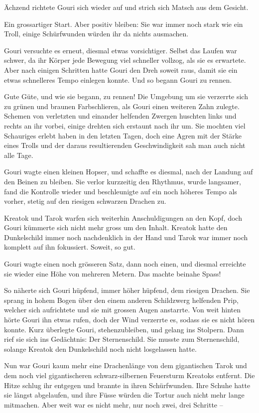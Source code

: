 Ächzend richtete Gouri sich wieder auf und strich sich Matsch aus dem Gesicht.

Ein grossartiger Start. Aber positiv bleiben: Sie war immer noch stark wie ein Troll, einige Schürfwunden würden ihr da nichts ausmachen.

Gouri versuchte es erneut, diesmal etwas vorsichtiger. Selbst das Laufen war schwer, da ihr Körper jede Bewegung viel schneller vollzog, als sie es erwartete. Aber nach einigen Schritten hatte Gouri den Dreh soweit raus, damit sie ein etwas schnelleres Tempo einlegen konnte. Und so begann Gouri zu rennen.

Gute Güte, und wie sie begann, zu rennen! Die Umgebung um sie verzerrte sich zu grünen und braunen Farbschlieren, als Gouri einen weiteren Zahn zulegte. Schemen von verletzten und einander helfenden Zwergen huschten links und rechts an ihr vorbei, einige drehten sich erstaunt nach ihr um. Sie mochten viel Schauriges erlebt haben in den letzten Tagen, doch eine Agren mit der Stärke eines Trolls und der daraus resultierenden Geschwindigkeit sah man auch nicht alle Tage.

Gouri wagte einen kleinen Hopser, und schaffte es diesmal, nach der Landung auf den Beinen zu bleiben. Sie verlor kurzzeitig den Rhythmus, wurde langsamer, fand die Kontrolle wieder und beschleunigte auf ein noch höheres Tempo als vorher, stetig auf den riesigen schwarzen Drachen zu.

Kreatok und Tarok warfen sich weiterhin Anschuldigungen an den Kopf, doch Gouri kümmerte sich nicht mehr gross um den Inhalt. Kreatok hatte den Dunkelschild immer noch nachdenklich in der Hand und Tarok war immer noch komplett auf ihn fokussiert. Soweit, so gut.

Gouri wagte einen noch grösseren Satz, dann noch einen, und diesmal erreichte sie wieder eine Höhe von mehreren Metern. Das machte beinahe Spass!

So näherte sich Gouri hüpfend, immer höher hüpfend, dem riesigen Drachen. Sie sprang in hohem Bogen über den einem anderen Schildzwerg helfenden Prip, welcher sich aufrichtete und sie mit grossen Augen anstarrte. Von weit hinten hörte Gouri ihn etwas rufen, doch der Wind verzerrte es, sodass sie es nicht hören konnte. Kurz überlegte Gouri, stehenzubleiben, und gelang ins Stolpern. Dann rief sie sich ins Gedächtnis: Der Sternenschild. Sie musste zum Sternenschild, solange Kreatok den Dunkelschild noch nicht losgelassen hatte.

Nun war Gouri kaum mehr eine Drachenlänge von dem gigantischen Tarok und dem noch viel gigantischeren schwarz-silbernen Feuersturm Kreatoks entfernt. Die Hitze schlug ihr entgegen und brannte in ihren Schürfwunden. Ihre Schuhe hatte sie längst abgelaufen, und ihre Füsse würden die Tortur auch nicht mehr lange mitmachen. Aber weit war es nicht mehr, nur noch zwei, drei Schritte –

